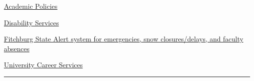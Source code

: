 \documentclass[
  letterpaper,
  DIV=11,
  numbers=noendperiod,
  oneside]{scrartcl}
\begin{document}
\href{http://catalog.fitchburgstate.edu/content.php?catoid=13&navoid=851}{Academic
Policies}

\href{http://www.fitchburgstate.edu/offices-services-directory/disability-services/}{Disability
Services}

\href{https://www.getrave.com/login/fitchburgstate/}{Fitchburg State
Alert system for emergencies, snow closures/delays, and faculty
absences}

\href{http://www.fitchburgstate.edu/offices-services-directory/career-counseling-and-advising/careerservices/}{University
Career Services}

\begin{center}\rule{0.5\linewidth}{0.5pt}\end{center}
\end{document}
